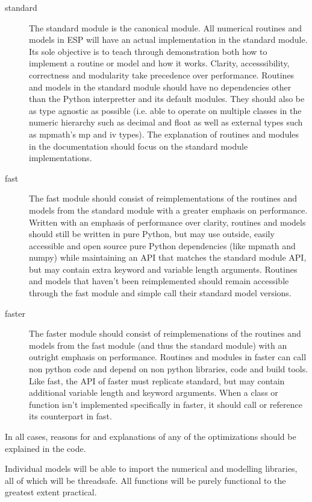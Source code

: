 \documentclass{article}
\begin{document}
\begin{description}
	\item[standard] The standard module is the canonical module. All numerical routines and models in ESP will have an actual implementation in the standard module. Its sole objective is to teach through demonstration both how to implement a routine or model and how it works. Clarity, accesssibility, correctness and modularity take precedence over performance. Routines and models in the standard module should have no dependencies other than the Python interpretter and its default modules.  They should also be as type agnostic as possible (i.e. able to operate on multiple classes in the numeric hierarchy such as decimal and float as well as external types such as mpmath's mp and iv types). The explanation of routines and modules in the documentation should focus on the standard module implementations.
	\item[fast] The fast module should consist of reimplementations of the routines and models from the standard module with a greater emphasis on performance. Written with an emphasis of performance over clarity, routines and models should still be written in pure Python, but may use outside, easily accessible and open source pure Python dependencies (like mpmath and numpy) while maintaining an API that matches the standard module API, but may contain extra keyword and variable length arguments. Routines and models that haven't been reimplemented should remain accessible through the fast module and simple call their standard model versions. 
	\item[faster] The faster module should consist of reimplemenations of the routines and models from the fast module (and thus the standard module) with an outright emphasis on performance. Routines and modules in faster can call non python code and depend on non python libraries, code and build tools. Like fast, the API of faster must replicate standard, but may contain additional variable length and keyword arguments. When a class or function isn't implemented specifically in faster, it should call or reference its counterpart in fast.
\end{description}
In all cases, reasons for and explanations of any of the optimizations should be explained in the code.

Individual models will be able to import the numerical and modelling libraries, all of which will be threadsafe. All functions will be purely functional to the greatest extent practical.
\end{document}
